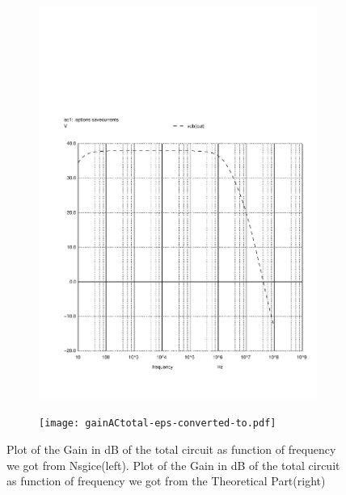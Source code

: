 \begin{figure}[h]
    \centering
    \begin{subfigure}{0.23\textwidth}
        \includegraphics[width=\linewidth, clip]{vo2f.pdf}
        \label{fig:output1}
    \end{subfigure}
    \begin{subfigure}{0.23\textwidth}
        \texttt{[image: gainACtotal-eps-converted-to.pdf]}
        \label{fig:output2}
    \end{subfigure}
    \caption{\small Plot of the Gain in dB of the total circuit as function of frequency we got from Nsgice(left).
        Plot of the Gain in dB of the total circuit as function of frequency we got from the Theoretical Part(right)}
    \label{output_deviation}
\end{figure}


